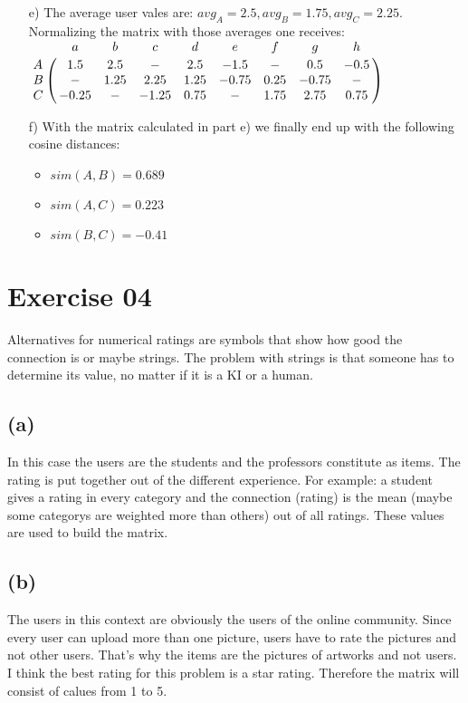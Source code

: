 \documentclass[11pt,a4paper]{scrartcl}
\begin{document}
\begin{itemize}
	\item[e)] The average user vales are: $avg_A = 2.5, avg_B = 1.75, avg_C = 2.25$. Normalizing the matrix with those averages one receives: \\
$\bordermatrix{
  & a	& b   & c & d & e & f & g & h  \cr
A & 1.5 & 2.5 & - & 2.5 & -1.5 & - & 0.5 & -0.5 \cr
B & - & 1.25 & 2.25 & 1.25 & -0.75 & 0.25 & -0.75 & - \cr
C & -0.25 & - & -1.25 & 0.75 & - & 1.75 & 2.75 & 0.75 \cr
}
$ 
	\item[f)] With the matrix calculated in part e) we finally end up with the following cosine distances:
	\begin{itemize}
		\item $sim(A,B) = 0.689 $
		\item $sim(A,C) = 0.223$
		\item $sim(B,C) = -0.41 $
	\end{itemize}
	\end{itemize}

\section*{Exercise 04}

Alternatives for numerical ratings are symbols that show how good the connection is or maybe strings. The problem with strings is that someone has to determine its value, no matter if it is a KI or a human.

\subsection*{(a)}

In this case the users are the students and the professors constitute as items. The rating is put together out of the different experience. For example: a student gives a rating in every category and the connection (rating) is the mean (maybe some categorys are weighted more than others) out of all ratings. These values are used to build the matrix.

\subsection*{(b)}

The users in this context are obviously the users of the online community. Since every user can upload more than one picture, users have to rate the pictures and not other users. That's why the items are the pictures of artworks and not users. I think the best rating for this problem is a star rating. Therefore the matrix will consist of calues from 1 to 5.
\end{document}
